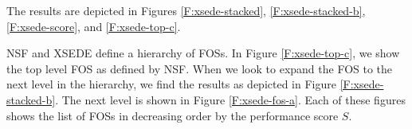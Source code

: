 \documentclass[10pt, conference, compsocconf]{IEEEtran}
\begin{document}

The results are depicted in Figures \ref{F:xsede-stacked}, \ref{F:xsede-stacked-b}, \ref{F:xsede-score}, and \ref{F:xsede-top-c}. 

NSF and XSEDE define a hierarchy of FOSs. In Figure \ref{F:xsede-top-c}, we show the top level FOS as defined by NSF. When we look to expand the FOS to the next level in the hierarchy, we find the results as depicted in Figure \ref{F:xsede-stacked-b}. The next level is shown in Figure \ref{F:xsede-fos-a}. Each of these figures shows the list of FOSs in decreasing order by the performance score $S$. 
\end{document}
